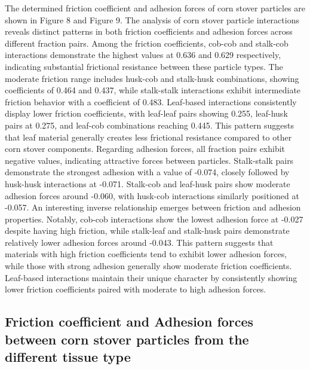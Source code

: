 \documentclass[xcolor=dvipsnames,10pt,hidelinks]{article}
\let\oldsubsection\subsection
\renewcommand{\subsection}{\clearpage\oldsubsection}
\begin{document}
The determined friction coefficient and adhesion forces of corn stover particles are shown in Figure 8 and Figure 9. The analysis of corn stover particle interactions reveals distinct patterns in both friction coefficients and adhesion forces across different fraction pairs. Among the friction coefficients, cob-cob and stalk-cob interactions demonstrate the highest values at 0.636 and 0.629 respectively, indicating substantial frictional resistance between these particle types. The moderate friction range includes husk-cob and stalk-husk combinations, showing coefficients of 0.464 and 0.437, while stalk-stalk interactions exhibit intermediate friction behavior with a coefficient of 0.483.
Leaf-based interactions consistently display lower friction coefficients, with leaf-leaf pairs showing 0.255, leaf-husk pairs at 0.275, and leaf-cob combinations reaching 0.445. This pattern suggests that leaf material generally creates less frictional resistance compared to other corn stover components.
Regarding adhesion forces, all fraction pairs exhibit negative values, indicating attractive forces between particles. Stalk-stalk pairs demonstrate the strongest adhesion with a value of -0.074, closely followed by husk-husk interactions at -0.071. Stalk-cob and leaf-husk pairs show moderate adhesion forces around -0.060, with husk-cob interactions similarly positioned at -0.057.
An interesting inverse relationship emerges between friction and adhesion properties. Notably, cob-cob interactions show the lowest adhesion force at -0.027 despite having high friction, while stalk-leaf and stalk-husk pairs demonstrate relatively lower adhesion forces around -0.043. This pattern suggests that materials with high friction coefficients tend to exhibit lower adhesion forces, while those with strong adhesion generally show moderate friction coefficients. Leaf-based interactions maintain their unique character by consistently showing lower friction coefficients paired with moderate to high adhesion forces.

\newpage
\subsection{Friction coefficient and Adhesion forces between corn stover particles from the different tissue type}
\label{sec:org0884d47}
\end{document}
